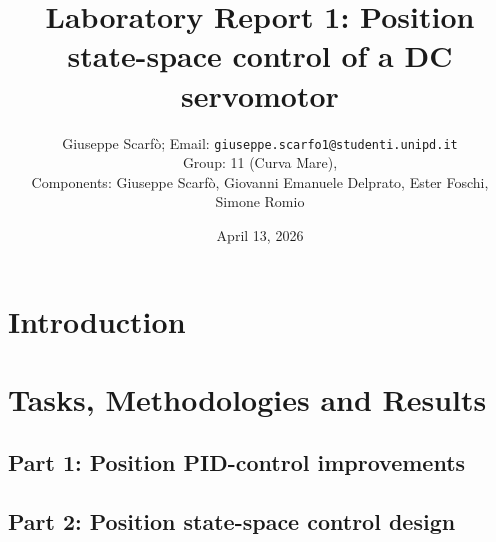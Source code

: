 \documentclass[11pt]{article}
\title{
	{\Large Laboratory Report 1: Position state-space control of a DC servomotor}
}
\author{
	Giuseppe Scarfò; Email: \texttt{giuseppe.scarfo1@studenti.unipd.it}\\
	Group: 11 (Curva Mare),
    \\Components: Giuseppe Scarfò, Giovanni Emanuele Delprato, Ester Foschi, Simone Romio
}
\date{April 13, 2026}
\begin{document}
\maketitle				
\pagestyle{fancy} 		
\setcounter{page}{1}	

\section{Introduction}





\section{Tasks, Methodologies and Results}

\subsection{Part 1: Position PID-control improvements}





\subsection{Part 2: Position state-space control design}











\label{LastPage}
\end{document}
